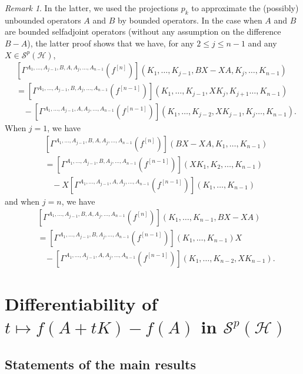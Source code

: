 \documentclass[12pt]{amsart}
\theoremstyle{remark}
\newtheorem{remark}[theorem]{Remark}
\begin{document}
\begin{remark}\label{approximatebdd}
In the latter, we used the projections $p_k$ to approximate the (possibly) unbounded operators $A$ and $B$ by bounded operators. In the case when $A$ and $B$ are bounded selfadjoint operators (without any assumption on the difference $B-A$), the latter proof shows that we have, for any $2\leq j \leq n-1$ and any $X\in \mathcal{S}^p(\mathcal{H})$,
\begin{align*}
& \left[ \Gamma^{A_1, \ldots, A_{j-1}, B, A, A_j, \ldots, A_{n-1}}(f^{[n]})\right](K_1, \ldots, K_{j-1}, BX - XA, K_j, \ldots, K_{n-1}) \\
& = \left[ \Gamma^{A_1, \ldots, A_{j-1}, B, A_j, \ldots, A_{n-1}}(f^{[n-1]})\right](K_1, \ldots, K_{j-1}, X K_j, K_{j+1} \ldots, K_{n-1})\\
& \ \ \ \ - \left[ \Gamma^{A_1, \ldots, A_{j-1}, A, A_j, \ldots, A_{n-1}}(f^{[n-1]})\right](K_1, \ldots, K_{j-2}, X K_{j-1}, K_j \ldots, K_{n-1}).
\end{align*}
When $j=1$, we have
\begin{align*}
& \left[ \Gamma^{A_1, \ldots, A_{j-1}, B, A, A_j, \ldots, A_{n-1}}(f^{[n]})\right](BX - XA, K_1, \ldots, K_{n-1}) \\
& = \left[ \Gamma^{A_1, \ldots, A_{j-1}, B, A_j, \ldots, A_{n-1}}(f^{[n-1]})\right](XK_1, K_2, \ldots, K_{n-1})\\
& \ \ \ \ - X\left[ \Gamma^{A_1, \ldots, A_{j-1}, A, A_j, \ldots, A_{n-1}}(f^{[n-1]})\right](K_1,\ldots, K_{n-1})
\end{align*}
and when $j=n$, we have
\begin{align*}
& \left[ \Gamma^{A_1, \ldots, A_{j-1}, B, A, A_j, \ldots, A_{n-1}}(f^{[n]})\right](K_1, \ldots, K_{n-1},BX - XA) \\
& = \left[ \Gamma^{A_1, \ldots, A_{j-1}, B, A_j, \ldots, A_{n-1}}(f^{[n-1]})\right](K_1, \ldots, K_{n-1})X\\
& \ \ \ \ - \left[ \Gamma^{A_1, \ldots, A_{j-1}, A, A_j, \ldots, A_{n-1}}(f^{[n-1]})\right](K_1,\ldots, K_{n-2}, X K_{n-1}).
\end{align*}
\end{remark}


\section{Differentiability of $t \mapsto f(A+tK) - f(A)$ in $\mathcal{S}^p(\mathcal{H})$}\label{Perturbation}


\subsection{Statements of the main results}\label{SecMR}
\end{document}

